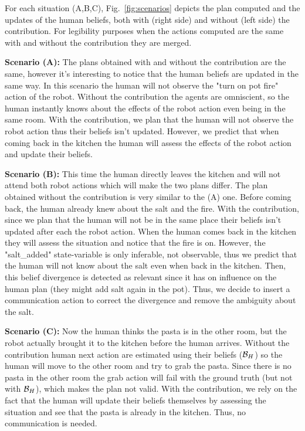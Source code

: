 \documentclass[letterpaper]{article} %
\begin{document}
For each situation (A,B,C), Fig.~\ref{fig:scenarios} depicts the plan computed and the updates of the human beliefs, both with (right side) and without (left side) the contribution. For legibility purposes when the actions computed are the same with and without the contribution they are merged.

\textbf{Scenario (A):} The plans obtained with and without the contribution are the same, however it's interesting to notice that the human beliefs are updated in the same way. In this scenario the human will not observe the "turn on pot fire" action of the robot. Without the contribution the agents are omniscient, so the human instantly knows about the effects of the robot action even being in the same room. With the contribution, we plan that the human will not observe the robot action thus their beliefs isn't updated. However, we predict that when coming back in the kitchen the human will assess the effects of the robot action and update their beliefs.

\textbf{Scenario (B):} This time the human directly leaves the kitchen and will not attend both robot actions which will make the two plans differ. The plan obtained without the contribution is very similar to the (A) one. Before coming back, the human already knew about the salt and the fire. With the contribution, since we plan that the human will not be in the same place their beliefs isn't updated after each the robot action. When the human comes back in the kitchen they will assess the situation and notice that the fire is on. However, the "salt\_added" state-variable is only inferable, not observable, thus we predict that the human will not know about the salt even when back in the kitchen. Then, this belief divergence is detected as relevant since it has on influence on the human plan (they might add salt again in the pot). Thus, we decide to insert a communication action to correct the divergence and remove the ambiguity about the salt.

\textbf{Scenario (C):} Now the human thinks the pasta is in the other room, but the robot actually brought it to the kitchen before the human arrives. Without the contribution human next action are estimated using their beliefs ($\mathcal{B}_H$) so the human will move to the other room and try to grab the pasta. Since there is no pasta in the other room the grab action will fail with the ground truth (but not with $\mathcal{B}_H$), which makes the plan not valid. With the contribution, we rely on the fact that the human will update their beliefs themselves by assessing the situation and see that the pasta is already in the kitchen. Thus, no communication is needed.
\end{document}
